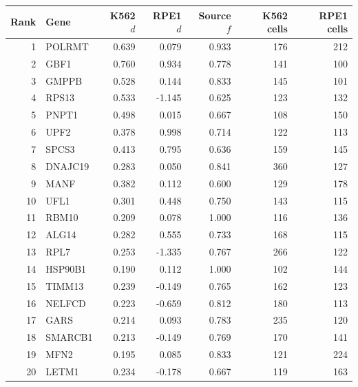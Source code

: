\documentclass[a4paper,fleqn]{cas-sc}
\makeatletter
\DeclareRobustCommand{\rev}[1]{{\color{red}\def\@citecolor{black}\def\@linkcolor{red}\def\@urlcolor{red}#1}}
\makeatother
\begin{document}
\begin{tabular}{rlrrrrr}
\toprule
\rev{Rank} & \rev{Gene} & \rev{K562 $d$} & \rev{RPE1 $d$} & \rev{Source $f$} & \rev{K562 cells} & \rev{RPE1 cells}\\
\midrule
\rev{1} & \rev{POLRMT} & \rev{0.639} & \rev{0.079} & \rev{0.933} & \rev{176} & \rev{212}\\
\rev{2} & \rev{GBF1} & \rev{0.760} & \rev{0.934} & \rev{0.778} & \rev{141} & \rev{100}\\
\rev{3} & \rev{GMPPB} & \rev{0.528} & \rev{0.144} & \rev{0.833} & \rev{145} & \rev{101}\\
\rev{4} & \rev{RPS13} & \rev{0.533} & \rev{-1.145} & \rev{0.625} & \rev{123} & \rev{132}\\
\rev{5} & \rev{PNPT1} & \rev{0.498} & \rev{0.015} & \rev{0.667} & \rev{108} & \rev{150}\\
\rev{6} & \rev{UPF2} & \rev{0.378} & \rev{0.998} & \rev{0.714} & \rev{122} & \rev{113}\\
\rev{7} & \rev{SPCS3} & \rev{0.413} & \rev{0.795} & \rev{0.636} & \rev{159} & \rev{145}\\
\rev{8} & \rev{DNAJC19} & \rev{0.283} & \rev{0.050} & \rev{0.841} & \rev{360} & \rev{127}\\
\rev{9} & \rev{MANF} & \rev{0.382} & \rev{0.112} & \rev{0.600} & \rev{129} & \rev{178}\\
\rev{10} & \rev{UFL1} & \rev{0.301} & \rev{0.448} & \rev{0.750} & \rev{143} & \rev{115}\\
\rev{11} & \rev{RBM10} & \rev{0.209} & \rev{0.078} & \rev{1.000} & \rev{116} & \rev{136}\\
\rev{12} & \rev{ALG14} & \rev{0.282} & \rev{0.555} & \rev{0.733} & \rev{168} & \rev{115}\\
\rev{13} & \rev{RPL7} & \rev{0.253} & \rev{-1.335} & \rev{0.767} & \rev{266} & \rev{122}\\
\rev{14} & \rev{HSP90B1} & \rev{0.190} & \rev{0.112} & \rev{1.000} & \rev{102} & \rev{144}\\
\rev{15} & \rev{TIMM13} & \rev{0.239} & \rev{-0.149} & \rev{0.765} & \rev{162} & \rev{123}\\
\rev{16} & \rev{NELFCD} & \rev{0.223} & \rev{-0.659} & \rev{0.812} & \rev{180} & \rev{113}\\
\rev{17} & \rev{GARS} & \rev{0.214} & \rev{0.093} & \rev{0.783} & \rev{235} & \rev{120}\\
\rev{18} & \rev{SMARCB1} & \rev{0.213} & \rev{-0.149} & \rev{0.769} & \rev{170} & \rev{141}\\
\rev{19} & \rev{MFN2} & \rev{0.195} & \rev{0.085} & \rev{0.833} & \rev{121} & \rev{224}\\
\rev{20} & \rev{LETM1} & \rev{0.234} & \rev{-0.178} & \rev{0.667} & \rev{119} & \rev{163}\\
\bottomrule
\end{tabular}
\end{document}
